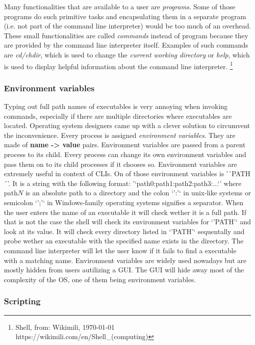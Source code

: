 Many functionalities that are available to a user are \textit{programs}. Some of those programs do such primitive
tasks and encapsulating them in a separate program (i.e. not part of the command line interpreter) would
be too much of an overhead. These small functionalities are called \textit{commands} instead of program because
they are provided by the command line interpreter itself. Examples of such commands are \textit{cd/chdir}, which
is used to change the \textit{current working directory} or \textit{help}, which is used to display helpful information
about the command line interpreter. \footnote{Shell, from: Wikimili, \today \\ https://wikimili.com/en/Shell\_(computing)}

\subsubsection{Environment variables}

Typing out full path names of executables is very annoying when invoking commands, especially if there
are multiple directories where executables are located. Operating system designers came up with a clever
solution to circumvent the inconvenience. Every process is assigned \textit{environment variables}. They are
made of \textbf{name -> value} pairs. Environment variables are passed from a parent process to its child.
Every process can change its own environment variables and pass them on to its child processes if it
chooses so. Environment variables are extremely useful in context of CLIs. On of those environment
variables is '´PATH´'. It is a string with the following format: '`path0:path1:path2:path3:...`' where
path$N$ is an absolute path to a directory and the colon `':'` in unix-like systems or semicolon `';'`
in Windows-family operating systems signifies a separator. When the user enters the name of an 
executable it will check wether it is a full path. If that is not the case the shell will check its
environment variables for `'PATH'` and look at its value. It will check every directory listed in
`'PATH'` sequentally and probe wether an executable with the specified name exists in the directory.
The command line interpreter will let the user know if it fails to find a executable with a matching
name. Environment variables are widely used nowadays but are mostly hidden from users autilizing a GUI.
The GUI will hide away most of the complexity of the OS, one of them being environment variables.


\subsubsection{Scripting}

